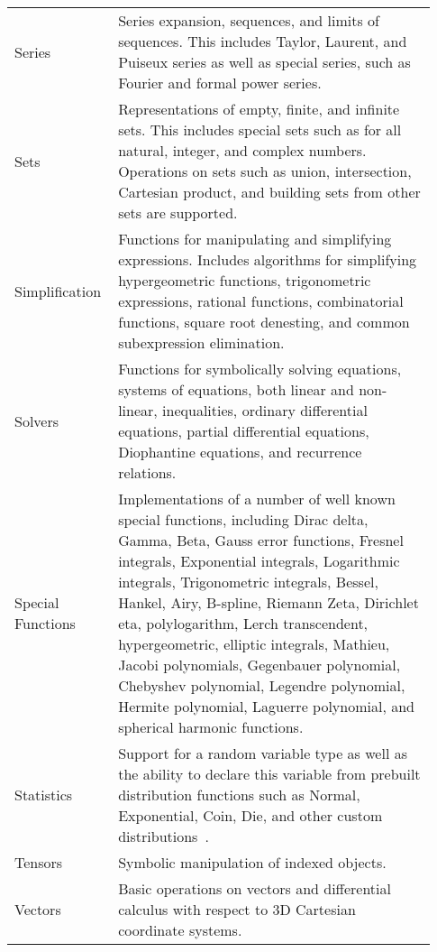 \begin{longtable}[htbc]{p{0.20\linewidth}p{0.73\linewidth}}
Series & Series expansion, sequences, and limits of sequences.
This includes Taylor, Laurent, and Puiseux series as well as special series, such
as Fourier and formal power series.\\

Sets & Representations of empty, finite, and infinite sets. This includes
special sets such as for all natural, integer, and complex numbers. Operations
on sets such as union, intersection, Cartesian product, and building sets from
other sets are supported.\\

Simplification & Functions for manipulating and simplifying expressions.
Includes algorithms for simplifying hypergeometric functions, trigonometric
expressions, rational functions, combinatorial functions, square root
denesting, and common subexpression elimination.\\

Solvers & Functions for symbolically solving equations, systems
of equations, both linear and non-linear, inequalities, ordinary differential
equations, partial differential equations, Diophantine equations, and
recurrence relations.\\

Special Functions & Implementations of a number of well known special functions,
including Dirac delta, Gamma, Beta, Gauss error functions, Fresnel integrals,
Exponential integrals, Logarithmic integrals, Trigonometric integrals, Bessel,
Hankel, Airy, B-spline, Riemann Zeta, Dirichlet eta, polylogarithm, Lerch
transcendent, hypergeometric, elliptic integrals, Mathieu, Jacobi polynomials,
Gegenbauer polynomial, Chebyshev polynomial, Legendre polynomial, Hermite
polynomial, Laguerre polynomial, and
spherical harmonic functions.\\

Statistics & Support for a random variable type as well as the ability to
declare this variable from prebuilt distribution functions such as
Normal, Exponential, Coin, Die, and other custom distributions~\cite{StatsMRocklin}.\\

Tensors & Symbolic manipulation of indexed objects.\\

Vectors & Basic operations on vectors and differential calculus with respect
to 3D Cartesian coordinate systems.\\
\bottomrule

\end{longtable}


